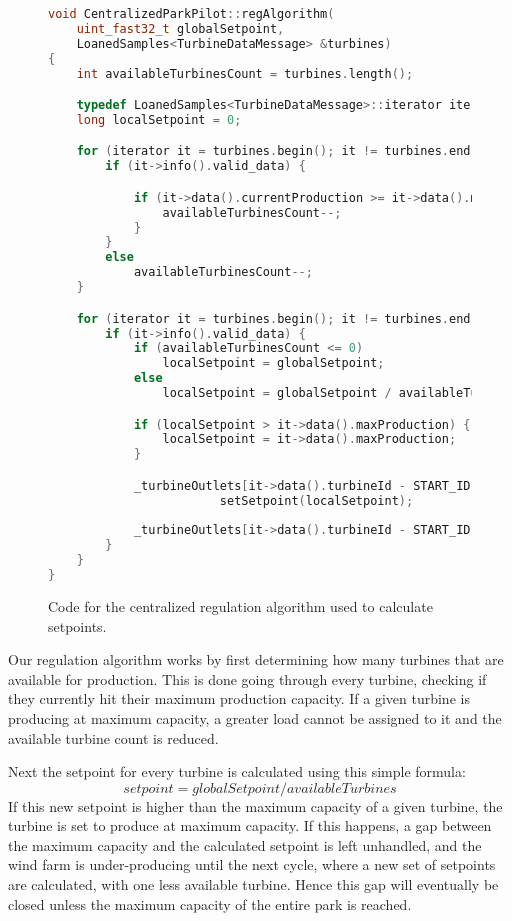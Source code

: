 \begin{figure}[!h]
	\centering
	\begin{lstlisting}[language=C++,tabsize=2,basicstyle=\small]
void CentralizedParkPilot::regAlgorithm(
	uint_fast32_t globalSetpoint,
	LoanedSamples<TurbineDataMessage> &turbines)
{
	int availableTurbinesCount = turbines.length();

	typedef LoanedSamples<TurbineDataMessage>::iterator iterator;
	long localSetpoint = 0;

	for (iterator it = turbines.begin(); it != turbines.end(); ++it) {
		if (it->info().valid_data) {

			if (it->data().currentProduction >= it->data().maxProduction) {
				availableTurbinesCount--;
			}
		}
		else
			availableTurbinesCount--;
	}

	for (iterator it = turbines.begin(); it != turbines.end(); ++it) {
		if (it->info().valid_data) {
			if (availableTurbinesCount <= 0)
				localSetpoint = globalSetpoint;
			else
				localSetpoint = globalSetpoint / availableTurbinesCount;

			if (localSetpoint > it->data().maxProduction) {
				localSetpoint = it->data().maxProduction;
			}

			_turbineOutlets[it->data().turbineId - START_ID]->
						setSetpoint(localSetpoint);
					
			_turbineOutlets[it->data().turbineId - START_ID]->publishData();
		}
	}
}
	\end{lstlisting}
	\caption[The regulation algorithm of the centralized solution]{
		\label{fig:cenRegAlgCode} 
		\footnotesize{%
			Code for the centralized regulation algorithm used to calculate setpoints.
		}
	}
\end{figure}


Our regulation algorithm works by first determining how many turbines that are available for production. This is done going through every turbine, checking if they currently hit their maximum production capacity. If a given turbine is producing at maximum capacity, a greater load cannot be assigned to it and the available turbine count is reduced. 

Next the setpoint for every turbine is calculated using this simple formula: $$setpoint=globalSetpoint/availableTurbines$$
If this new setpoint is higher than the maximum capacity of a given turbine, the turbine is set to produce at maximum capacity. If this happens, a gap between the maximum capacity and the calculated setpoint is left unhandled, and the wind farm is under-producing until the next cycle, where a new set of setpoints are calculated, with one less available turbine. Hence this gap will eventually be closed unless the maximum capacity of the entire park is reached.


